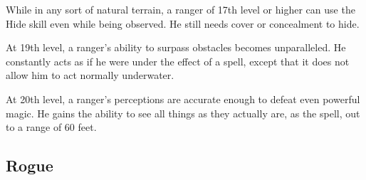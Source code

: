  While in any sort of natural terrain, a ranger of 17th level or higher can use the Hide skill even while being observed. He still needs cover or concealment to hide.

 At 19th level, a ranger's ability to surpass obstacles becomes unparalleled. He constantly acts as if he were under the effect of a  spell, except that it does not allow him to act normally underwater.

 At 20th level, a ranger's perceptions are accurate enough to defeat even powerful magic. He gains the ability to see all things as they actually are, as the  spell, out to a range of 60 feet.

\subsection{Rogue}
